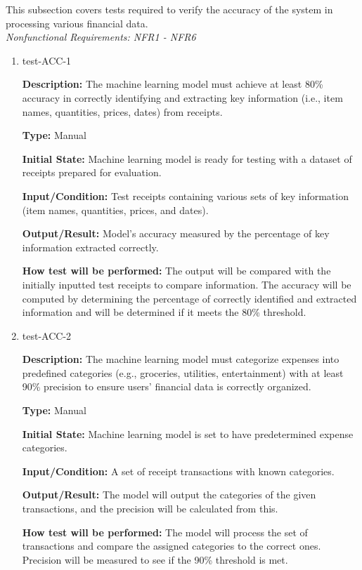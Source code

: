 \documentclass[12pt, titlepage]{article}
\begin{document}
This subsection covers tests required to verify the accuracy of the system in processing various financial data.\\
\textit{Nonfunctional Requirements: NFR1 - NFR6}

\begin{enumerate}

\item{test-ACC-1\\}

\textbf{Description:} The machine learning model must achieve at least 80\% accuracy in correctly identifying and extracting key information (i.e., item names, quantities, prices, dates) from receipts.

\textbf{Type:} Manual
					
\textbf{Initial State:} Machine learning model is ready for testing with a dataset of receipts prepared for evaluation.
					
\textbf{Input/Condition:} Test receipts containing various sets of key information (item names, quantities, prices, and dates).
					
\textbf{Output/Result:} Model's accuracy measured by the percentage of key information extracted correctly.
					
\textbf{How test will be performed:} The output will be compared with the initially inputted test receipts to compare information. The accuracy will be computed by determining the percentage of correctly identified and extracted information and will be determined if it meets the 80\% threshold.

\item{test-ACC-2\\}

\textbf{Description:} The machine learning model must categorize expenses into predefined categories (e.g., groceries, utilities, entertainment) with at least 90\% precision to ensure users' financial data is correctly organized.

\textbf{Type:} Manual
					
\textbf{Initial State:} Machine learning model is set to have predetermined expense categories.
					
\textbf{Input/Condition:} A set of receipt transactions with known categories.
					
\textbf{Output/Result:} The model will output the categories of the given transactions, and the precision will be calculated from this.
					
\textbf{How test will be performed:} The model will process the set of transactions and compare the assigned categories to the correct ones. Precision will be measured to see if the 90\% threshold is met.


\end{enumerate}
\end{document}
